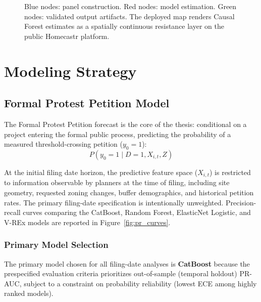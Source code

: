 \documentclass[11pt, letterpaper, oneside]{article}
\begin{document}
\begin{figure}[!htbp]
{
}
\caption[Data-to-Deployment Causal Pipeline]{Blue nodes: panel construction. Red nodes: model estimation. Green nodes: validated output artifacts. The deployed map renders Causal Forest estimates as a spatially continuous resistance layer on the public Homecastr platform.}
\label{fig:pipeline_arch}
\end{figure}

\section{Modeling Strategy}


\subsection{Formal Protest Petition Model}

The Formal Protest Petition forecast is the core of the thesis: conditional on a project entering the formal public process, predicting the probability of a measured threshold-crossing petition ($y_0 = 1$):
\begin{equation}
P(y_0 = 1 \mid D=1, X_{i,t}, Z)
\end{equation}

At the initial filing date horizon, the predictive feature space ($X_{i,t}$) is restricted to information observable by planners at the time of filing, including site geometry, requested zoning changes, buffer demographics, and historical petition rates. The primary filing-date specification is intentionally unweighted. Precision-recall curves comparing the CatBoost, Random Forest, ElasticNet Logistic, and V-REx models are reported in Figure~\ref{fig:pr_curves}.



\subsubsection{Primary Model Selection}
The primary model chosen for all filing-date analyses is \textbf{CatBoost} because the prespecified evaluation criteria prioritizes out-of-sample (temporal holdout) PR-AUC, subject to a constraint on probability reliability (lowest ECE among highly ranked models).
\end{document}
